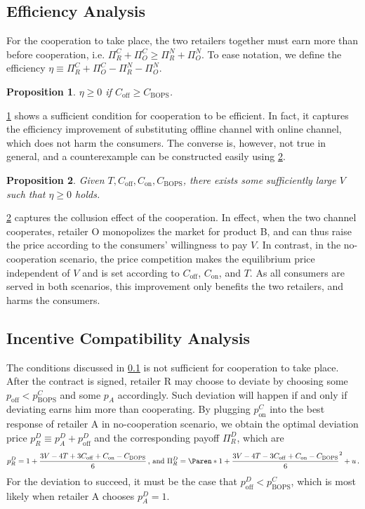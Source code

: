 \documentclass[a4paper]{article}
\theoremstyle{definition}
\theoremstyle{plain}
\newtheorem{proposition}{Proposition}
\theoremstyle{remark}
\newcommand{\on}{\mathrm{on}}
\newcommand{\off}{\mathrm{off}}
\newcommand{\BOPS}{\mathrm{BOPS}}
\begin{document}
\subsection{Efficiency Analysis}\label{subsec:eff}
For the cooperation to take place,
the two retailers together must earn more than before cooperation,
i.e. $\Pi_R^C+\Pi_O^C\geq \Pi_R^N+\Pi_O^N$.
To ease notation,
we define the efficiency $\eta\equiv \Pi_R^C+\Pi_O^C-\Pi_R^N-\Pi_O^N$.

\begin{proposition}\label{prop:eff_C}
    $\eta\geq 0$ if $C_{\off}\geq C_{\BOPS}$.
\end{proposition}

\cref{prop:eff_C} shows a sufficient condition for cooperation to be efficient.
In fact,
it captures the efficiency improvement of substituting offline channel with online channel,
which does not harm the consumers.
The converse is,
however,
not true in general,
and a counterexample can be constructed easily using \cref{prop:eff_V}.

\begin{proposition}\label{prop:eff_V}
    Given $T,C_{\off},C_{\on},C_{\BOPS}$,
    there exists some sufficiently large $V$ such that $\eta\geq 0$ holds.
\end{proposition}

\cref{prop:eff_V} captures the collusion effect of the cooperation.
In effect,
when the two channel cooperates,
retailer O monopolizes the market for product B,
and can thus raise the price according to the consumers' willingness to pay $V$.
In contrast,
in the no-cooperation scenario,
the price competition makes the equilibrium price independent of $V$ and is set according to $C_{\off}$, $C_{\on}$, and $T$.
As all consumers are served in both scenarios,
this improvement only benefits the two retailers,
and harms the consumers.

\subsection{Incentive Compatibility Analysis}\label{subsec:IC}
The conditions discussed in \cref{subsec:eff} is not sufficient for cooperation to take place.
After the contract is signed,
retailer R may choose to deviate by choosing some $p_{\off}<p_{\BOPS}^C$ and some $p_A$ accordingly.
Such deviation will happen if and only if deviating earns him more than cooperating.
By plugging $p_{\on}^C$ into the best response of retailer A in no-cooperation scenario,
we obtain the optimal deviation price $p_R^D\equiv p_A^D+p_{\off}^D$ and the corresponding payoff $\Pi_R^D$,
which are
\[
    p_R^D=1+\frac{3V-4T+3C_{\off}+C_{\on}-C_{\BOPS}}{6}\,\text{, and }\Pi_R^D=\Paren*{1+\frac{3V-4T-3C_{\off}+C_{\on}-C_{\BOPS}}{6}}^2+u\,.
\]
For the deviation to succeed,
it must be the case that $p_{\off}^D<p_{\BOPS}^C$,
which is most likely when retailer A chooses $p_A^D=1$.
\end{document}
